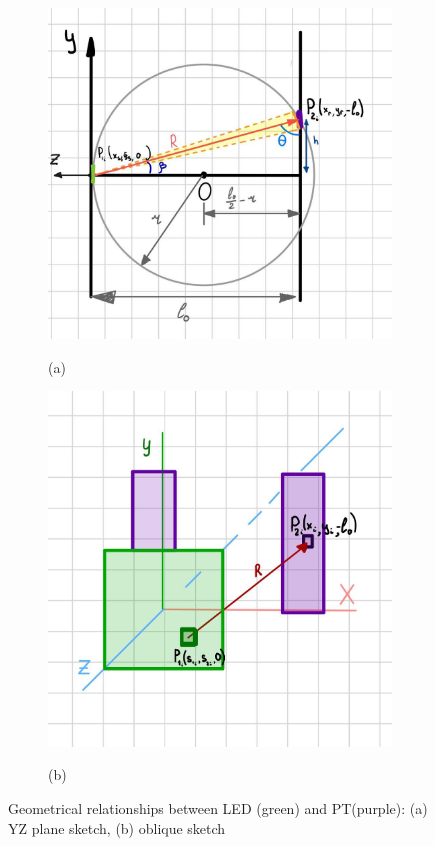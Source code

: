 \begin{figure}[H]
  \centering
  \begin{subfigure}[b]{0.3\textwidth}
    \includegraphics[width=\textwidth]{figs/simplified_model_notebook.jpg}
    \label{fig:sketch_ZY}
      \caption*{(a)}
    \end{subfigure}
    \begin{subfigure}[b]{0.32\textwidth}
      \includegraphics[width=\textwidth]{figs/oblique_draft.jpg}
      \label{fig:sketch_oblique}
      \caption*{(b)}
    \end{subfigure}
  \caption{Geometrical relationships between LED (green) and PT(purple): (a) YZ plane sketch, (b) oblique sketch}
  \label{fig:LED_PT_scetch}
\end{figure}


